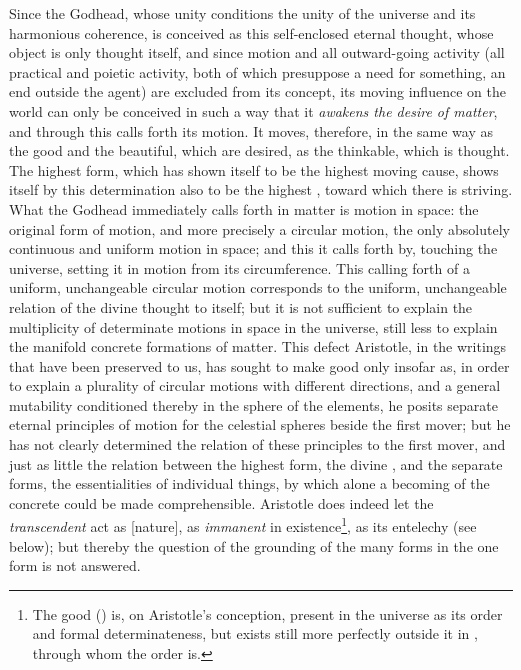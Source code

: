 Since the Godhead, whose unity conditions the unity of the universe
and its harmonious coherence, is conceived as this self-enclosed eternal thought, whose object is only thought itself, and since
motion and all outward-going activity (all practical and poietic activity, both of which presuppose a need for something, an
end outside the agent) are excluded from its concept, its
moving influence on the world can only be conceived in such a way
that it \emph{awakens the desire of matter}, and through this
calls forth its motion. It moves, therefore, in the same
way as the good and the beautiful, which are desired, as the
thinkable, which is thought. The highest form, which has shown itself
to be the highest moving cause, shows itself by this determination also to be the highest , toward which there is striving.
What the Godhead immediately calls forth in matter is motion in space: the original form of motion, and more precisely a circular motion, the only absolutely continuous and
uniform motion in space; and this it calls forth by,
touching the universe, setting it in motion from its circumference. This calling forth of a uniform, unchangeable circular motion corresponds to the uniform,
 \setcounter{footnote}{0}
unchangeable relation of the divine thought to itself; but it is not sufficient
to explain the multiplicity of determinate motions in space in
the universe, still less to explain the manifold concrete formations of matter. This defect Aristotle, in the
writings that have been preserved to us, has sought to make good only insofar
as, in order to explain a plurality of circular motions with
different directions, and a general mutability conditioned thereby in the sphere of the elements, he posits separate eternal principles of motion for the celestial spheres beside the first
mover; but he has not clearly determined the relation of these principles
to the first mover, and just as little the relation between the highest
form, the divine , and the separate forms, the
essentialities of individual things, by which alone a becoming of the concrete could be made comprehensible. Aristotle does indeed let the
\emph{transcendent}  act as  [nature], as \emph{immanent} in
existence\footnote{The good () is, on Aristotle's conception, present in the universe as its order and formal determinateness, but
exists still more perfectly outside it in , through whom the order is.}, as its entelechy (see below); but thereby
the question of the grounding of the many forms in the
one form is not answered.

